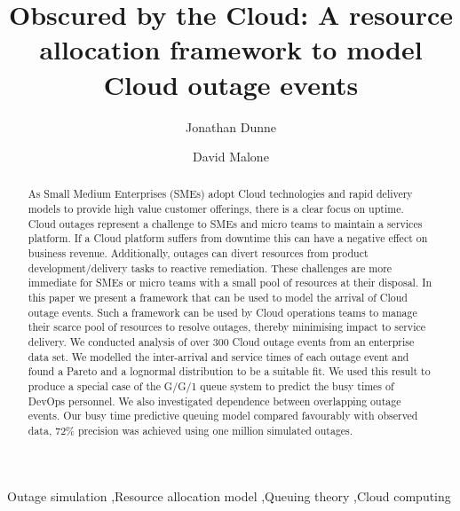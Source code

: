 \documentclass[5p]{elsarticle}
\begin{document}
\begin{frontmatter}

\title{Obscured by the Cloud: A resource allocation framework to model Cloud outage events}


\author[mymainaddress]{Jonathan Dunne}

\author[mymainaddress]{David Malone}

\address[mymainaddress]{Hamilton Institute, Maynooth University, Kildare, Ireland}

\begin{abstract}
As Small Medium Enterprises (SMEs) adopt Cloud technologies and rapid delivery models to provide high value customer offerings, there is a clear focus on uptime. Cloud outages represent a challenge to SMEs and micro teams to maintain a services platform. If a Cloud platform suffers from downtime this can have a negative effect on business revenue. Additionally, outages can divert resources from product development/delivery tasks to reactive remediation. These challenges are more immediate for SMEs or micro teams with a small pool of resources at their disposal. In this paper we present a framework that can be used to model the arrival of Cloud outage events. Such a framework can be used by Cloud operations teams to manage their scarce pool of resources to resolve outages, thereby minimising impact to service delivery. We conducted analysis of over 300 Cloud outage events from an enterprise data set. We modelled the inter-arrival and service times of each outage event and found a Pareto and a lognormal distribution to be a suitable fit. We used this result to produce a special case of the G/G/1 queue system to predict the busy times of DevOps personnel. We also investigated dependence between overlapping outage events. Our busy time predictive queuing model compared favourably with observed data, 72\% precision was achieved using one million simulated outages. 

\end{abstract}

\begin{keyword}
Outage simulation \sep Resource allocation model \sep Queuing theory \sep Cloud computing
\end{keyword}

\end{frontmatter}
\end{document}

